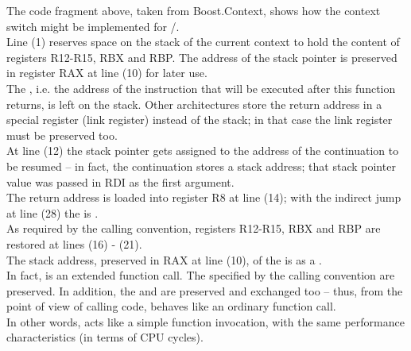 The code fragment above, taken from Boost.Context\cite{bcontext}, shows how the
context switch might be implemented for /.\\
Line (1) reserves space on the stack of the current context to hold the content of
registers R12-R15, RBX and RBP. The address of the stack pointer is preserved in
register RAX at line (10) for later use.\\
The , i.e. the address of the instruction that will be
executed after this function returns, is left on the stack. Other architectures
store the return address in a special register (link register) instead of the
stack; in that case the link register must be preserved too.\\
At line (12) the stack pointer gets assigned to the address of the
continuation to be resumed -- in fact, the continuation stores a
stack address; that stack pointer value was passed in RDI as the first argument.\\
The return address is loaded into register R8 at line (14); with the indirect
jump at line (28) the  is .\\
As required by the calling convention, registers R12-R15, RBX and RBP are
restored at lines (16) - (21).\\
The stack address, preserved in RAX at line (10), of the
 is  as a .\\

In fact, \cc is an extended function call. The  specified by the calling convention are preserved. In addition, the
 and  are preserved and exchanged
too -- thus, from the point of view of calling code, \cc behaves like an
ordinary function call.\\
In other words, \cc acts like a simple function invocation, with the
same performance characteristics (in terms of CPU cycles).
